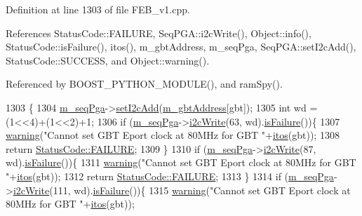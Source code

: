 Definition at line 1303 of file F\+E\+B\+\_\+v1.\+cpp.



References Status\+Code\+::\+F\+A\+I\+L\+U\+RE, Seq\+P\+G\+A\+::i2c\+Write(), Object\+::info(), Status\+Code\+::is\+Failure(), itos(), m\+\_\+gbt\+Address, m\+\_\+seq\+Pga, Seq\+P\+G\+A\+::set\+I2c\+Add(), Status\+Code\+::\+S\+U\+C\+C\+E\+SS, and Object\+::warning().



Referenced by B\+O\+O\+S\+T\+\_\+\+P\+Y\+T\+H\+O\+N\+\_\+\+M\+O\+D\+U\+L\+E(), and ram\+Spy().


\begin{DoxyCode}
1303                                              \{
1304   \hyperlink{classFEB__v1_a6c7804ac86796f233a8393043adf2e77}{m\_seqPga}->\hyperlink{classSeqPGA_a4ef334e4d2cb417b49033dce951728cd}{setI2cAdd}(\hyperlink{classFEB__v1_ac625855df976f16694178f1a4c0eef1e}{m\_gbtAddress}[gbt]);
1305   \textcolor{keywordtype}{int} wd = (1<<4)+(1<<2)+1;
1306   \textcolor{keywordflow}{if} (\hyperlink{classFEB__v1_a6c7804ac86796f233a8393043adf2e77}{m\_seqPga}->\hyperlink{classSeqPGA_a429076ca3a4ece94182bd95c623bb9d0}{i2cWrite}(63, wd).\hyperlink{classStatusCode_a5dd22dc6eb2c52fc4cabc58f6dea2eb7}{isFailure}())\{
1307     \hyperlink{classObject_a65cd4fda577711660821fd2cd5a3b4c9}{warning}(\textcolor{stringliteral}{"Cannot set GBT Eport clock at 80MHz for GBT "}+\hyperlink{Tools_8h_af330027dbdafb9a30768b3613c553e60}{itos}(gbt));
1308     \textcolor{keywordflow}{return} \hyperlink{classStatusCode_a6f565cbeadc76d14c72f047e5e85eb4ba3da73d4c469762eb9d3c960368252b26}{StatusCode::FAILURE};
1309   \}
1310   \textcolor{keywordflow}{if} (\hyperlink{classFEB__v1_a6c7804ac86796f233a8393043adf2e77}{m\_seqPga}->\hyperlink{classSeqPGA_a429076ca3a4ece94182bd95c623bb9d0}{i2cWrite}(87, wd).\hyperlink{classStatusCode_a5dd22dc6eb2c52fc4cabc58f6dea2eb7}{isFailure}())\{
1311     \hyperlink{classObject_a65cd4fda577711660821fd2cd5a3b4c9}{warning}(\textcolor{stringliteral}{"Cannot set GBT Eport clock at 80MHz for GBT "}+\hyperlink{Tools_8h_af330027dbdafb9a30768b3613c553e60}{itos}(gbt));
1312     \textcolor{keywordflow}{return} \hyperlink{classStatusCode_a6f565cbeadc76d14c72f047e5e85eb4ba3da73d4c469762eb9d3c960368252b26}{StatusCode::FAILURE};
1313   \}
1314   \textcolor{keywordflow}{if} (\hyperlink{classFEB__v1_a6c7804ac86796f233a8393043adf2e77}{m\_seqPga}->\hyperlink{classSeqPGA_a429076ca3a4ece94182bd95c623bb9d0}{i2cWrite}(111, wd).\hyperlink{classStatusCode_a5dd22dc6eb2c52fc4cabc58f6dea2eb7}{isFailure}())\{
1315     \hyperlink{classObject_a65cd4fda577711660821fd2cd5a3b4c9}{warning}(\textcolor{stringliteral}{"Cannot set GBT Eport clock at 80MHz for GBT "}+\hyperlink{Tools_8h_af330027dbdafb9a30768b3613c553e60}{itos}(gbt));

\end{DoxyCode}
